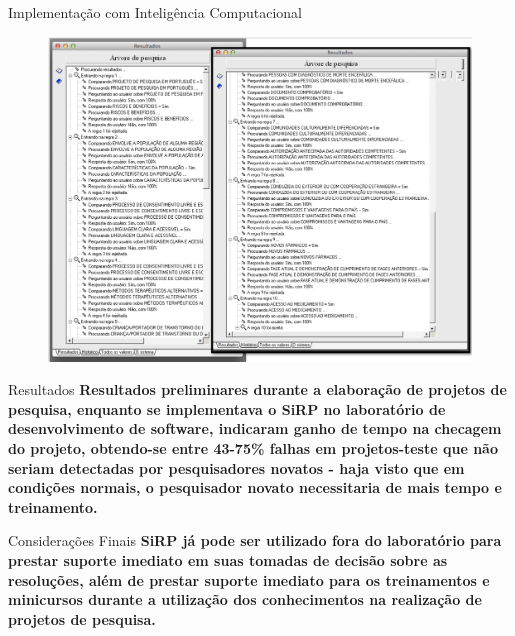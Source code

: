 \documentclass[final]{beamer}
\newlength{\onecolwid}
\begin{document}
\begin{frame}[t]
\begin{columns}[t]
\begin{column}{\onecolwid}
\begin{block}{Implementação com Inteligência Computacional}
 \begin{figure}
 \vspace*{1cm}
 \includegraphics[width=.85\linewidth]{regras.png}
 \end{figure}
 \end{block}

      \begin{block}{Resultados}
 \textbf{Resultados preliminares durante a elaboração de projetos de pesquisa, enquanto se implementava o SiRP no laboratório de desenvolvimento de software, indicaram ganho de tempo na checagem do projeto, obtendo-se entre 43-75\% falhas em projetos-teste que não seriam detectadas por pesquisadores novatos - haja visto que em condições normais, o pesquisador novato necessitaria de mais tempo e treinamento.}
 \end{block}

 \begin{block}{Considerações Finais}
 \textbf{SiRP já pode ser utilizado fora do laboratório para prestar suporte imediato em suas tomadas de decisão sobre as resoluções, além de prestar suporte imediato para os treinamentos e minicursos durante a utilização dos conhecimentos na realização de projetos de pesquisa.}
 \end{block}


\end{column}
\end{columns}
\end{frame}
\end{document}
